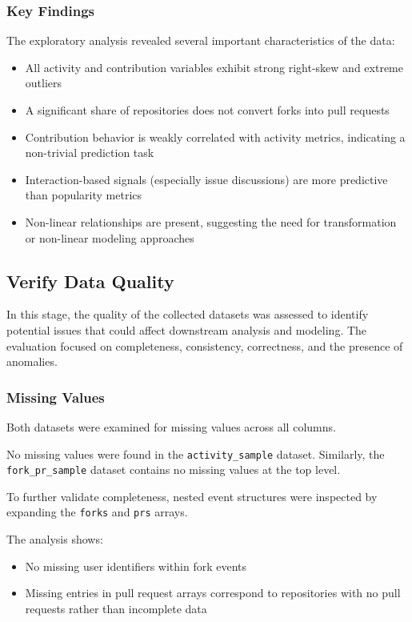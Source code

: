 \subsubsection{Key Findings}

The exploratory analysis revealed several important characteristics of the data:

\begin{itemize}
    \item All activity and contribution variables exhibit strong right-skew and extreme outliers
    \item A significant share of repositories does not convert forks into pull requests
    \item Contribution behavior is weakly correlated with activity metrics, indicating a non-trivial prediction task
    \item Interaction-based signals (especially issue discussions) are more predictive than popularity metrics
    \item Non-linear relationships are present, suggesting the need for transformation or non-linear modeling approaches
\end{itemize}

\subsection{Verify Data Quality}

In this stage, the quality of the collected datasets was assessed to identify potential issues that could affect downstream analysis and modeling. The evaluation focused on completeness, consistency, correctness, and the presence of anomalies.

\subsubsection{Missing Values}

Both datasets were examined for missing values across all columns.

No missing values were found in the \texttt{activity\_sample} dataset. Similarly, the \texttt{fork\_pr\_sample} dataset contains no missing values at the top level.

To further validate completeness, nested event structures were inspected by expanding the \texttt{forks} and \texttt{prs} arrays.

The analysis shows:
\begin{itemize}
    \item No missing user identifiers within fork events
    \item Missing entries in pull request arrays correspond to repositories with no pull requests rather than incomplete data
\end{itemize}

